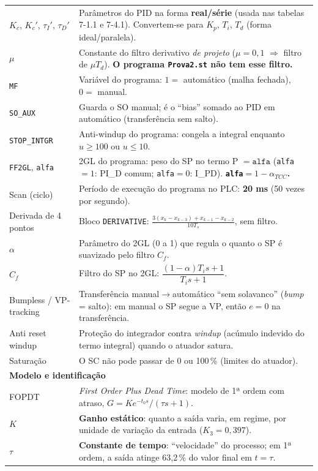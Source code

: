 \documentclass[11pt,a4paper]{article}
\begin{document}
\begin{center}
\begin{longtable}{p{2.7cm}p{12.3cm}}
$K_c$, $K_c'$, $\tau_I'$, $\tau_D'$ & Parâmetros do PID na forma \textbf{real/série} (usada nas tabelas 7-1.1 e 7-4.1). Convertem-se para $K_p$, $T_i$, $T_d$ (forma ideal/paralela).\\
$\mu$ & Constante do filtro derivativo \emph{de projeto} ($\mu=0{,}1$ $\Rightarrow$ filtro de $\mu T_d$). \textbf{O programa \texttt{Prova2.st} não tem esse filtro.}\\
\texttt{MF} & Variável do programa: $1=$ automático (malha fechada), $0=$ manual.\\
\texttt{SO\_AUX} & Guarda o SO manual; é o ``bias'' somado ao PID em automático (transferência sem salto).\\
\texttt{STOP\_INTGR} & Anti-windup do programa: congela a integral enquanto $u\ge100$ ou $u\le10$.\\
\texttt{FF2GL}, \texttt{alfa} & 2GL do programa: peso do SP no termo P $=\mathtt{alfa}$ (\texttt{alfa}$=1$: PI\_D comum; \texttt{alfa}$=0$: I\_PD). \textbf{\texttt{alfa}$=1-\alpha_{TCC}$.}\\
Scan (ciclo) & Período de execução do programa no PLC: \textbf{20 ms} (50 vezes por segundo).\\
Derivada de 4 pontos & Bloco \texttt{DERIVATIVE}: $\frac{3(x_k-x_{k-3})+x_{k-1}-x_{k-2}}{10T_s}$, sem filtro.\\
$\alpha$ & Parâmetro do 2GL (0 a 1) que regula o quanto o SP é suavizado pelo filtro $C_f$.\\
$C_f$ & Filtro do SP no 2GL: $\dfrac{(1-\alpha)T_is+1}{T_is+1}$.\\
Bumpless / VP-tracking & Transferência manual$\to$automático ``sem solavanco'' (\emph{bump} = salto): em manual o SP segue a VP, então $e=0$ na transferência.\\
Anti reset windup & Proteção do integrador contra \emph{windup} (acúmulo indevido do termo integral) quando o atuador satura.\\
Saturação & O SC não pode passar de 0 ou 100\,\% (limites do atuador).\\
\multicolumn{2}{l}{\textbf{Modelo e identificação}}\\
FOPDT & \emph{First Order Plus Dead Time}: modelo de 1ª ordem com atraso, $G=Ke^{-t_0s}/(\tau s+1)$.\\
$K$ & \textbf{Ganho estático}: quanto a saída varia, em regime, por unidade de variação da entrada ($K_3=0{,}397$).\\
$\tau$ & \textbf{Constante de tempo}: ``velocidade'' do processo; em 1ª ordem, a saída atinge 63,2\,\% do valor final em $t=\tau$.\\

\end{longtable}
\end{center}
\end{document}
